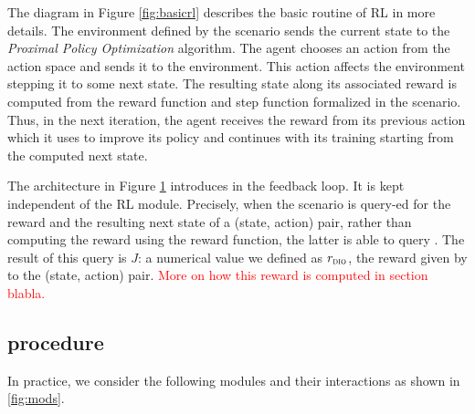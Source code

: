 \begin{figure}[H]
\begin{minipage}{.45\textwidth}
    \label{fig:diorl}
  \end{minipage}
\end{figure}

The diagram in Figure \ref{fig:basicrl} describes the basic routine of RL in more details. The environment defined by the scenario sends the current state 
to the \emph{Proximal Policy Optimization} algorithm. The agent chooses an action from the action space and sends it to the environment. This action affects the environment stepping it to some next state. 
The resulting state along its associated reward is computed from the reward function and step function formalized in the scenario. Thus, in the next iteration, the 
agent receives the reward from its previous action which it uses to improve its policy and continues with its training starting from the computed next state.  

\medskip 

The architecture in Figure \ref{fig:diorl} introduces \dio{} in the feedback loop. It is kept independent of the RL module. Precisely, when the scenario is query-ed for the reward and 
the resulting next state of a (state, action) pair, rather than computing the reward using the reward function, the latter is able to query \dio{}. The result of this query is $J$: a numerical value 
we defined as $r_{\textsc{dio}}{}$, the reward given by \dio{} to the (state, action) pair. \textcolor{red}{More on how this reward is computed in section blabla.}
 

\subsection{\dio{} procedure}
\label{sec:modules}
In practice, we consider the following modules and their interactions as shown in \ref{fig:mods}.


